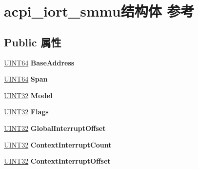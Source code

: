 \hypertarget{structacpi__iort__smmu}{}\section{acpi\+\_\+iort\+\_\+smmu结构体 参考}
\label{structacpi__iort__smmu}
\subsection*{Public 属性}
\begin{DoxyCompactItemize}
\item 
\mbox{\label{structacpi__iort__smmu_ac2494c6000ea4ee75cab1f72a0230c0e}} 
\hyperlink{_processor_bind_8h_a57be03562867144161c1bfee95ca8f7c}{U\+I\+N\+T64} {\bfseries Base\+Address}
\item 
\mbox{\label{structacpi__iort__smmu_a67de8937f901f6c60f2c20c19b435cc7}} 
\hyperlink{_processor_bind_8h_a57be03562867144161c1bfee95ca8f7c}{U\+I\+N\+T64} {\bfseries Span}
\item 
\mbox{\label{structacpi__iort__smmu_a782cbc68524fc0a83554d4ff6c1f1ef7}} 
\hyperlink{_processor_bind_8h_ae1e6edbbc26d6fbc71a90190d0266018}{U\+I\+N\+T32} {\bfseries Model}
\item 
\mbox{\label{structacpi__iort__smmu_a9da5c1eca4b56a0fc7888edaa12262af}} 
\hyperlink{_processor_bind_8h_ae1e6edbbc26d6fbc71a90190d0266018}{U\+I\+N\+T32} {\bfseries Flags}
\item 
\mbox{\label{structacpi__iort__smmu_aaccef4b9454ec85e51c1131bfd488107}} 
\hyperlink{_processor_bind_8h_ae1e6edbbc26d6fbc71a90190d0266018}{U\+I\+N\+T32} {\bfseries Global\+Interrupt\+Offset}
\item 
\mbox{\label{structacpi__iort__smmu_a371ffd165e421eb9ef21d9fefb6eac30}} 
\hyperlink{_processor_bind_8h_ae1e6edbbc26d6fbc71a90190d0266018}{U\+I\+N\+T32} {\bfseries Context\+Interrupt\+Count}
\item 
\mbox{\label{structacpi__iort__smmu_ab0bf21cbcb6777a5e8007421db16d67b}} 
\hyperlink{_processor_bind_8h_ae1e6edbbc26d6fbc71a90190d0266018}{U\+I\+N\+T32} {\bfseries Context\+Interrupt\+Offset}

\end{DoxyCompactItemize}
